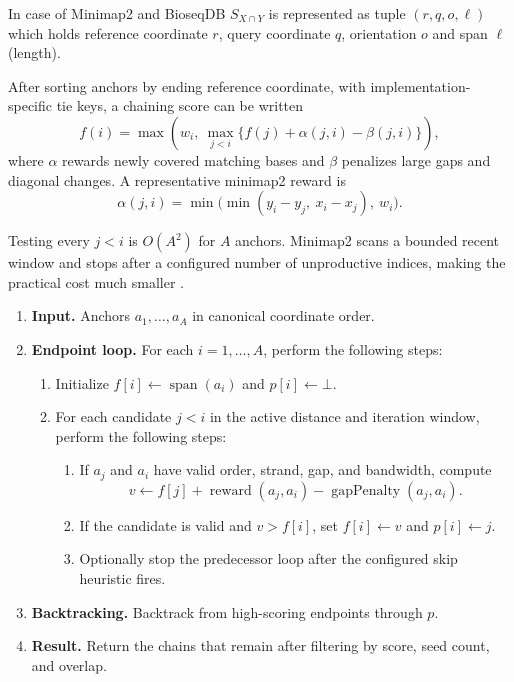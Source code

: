 In case of Minimap2 and BioseqDB $S_{X \cap Y}$ is represented as tuple \((r,q,o,\ell)\) which holds reference coordinate \(r\), query coordinate \(q\),
orientation \(o\) and span \(\ell\) (length).

After sorting anchors by
ending reference coordinate, with implementation-specific tie keys, a
chaining score can be written
\begin{equation}
 f(i)=\max\left(
     w_i,\ 
     \max_{j<i}\{f(j)+\alpha(j,i)-\beta(j,i)\}
   \right),
 \label{eq:minimap2-chain}
\end{equation}
where \(\alpha\) rewards newly covered matching bases and \(\beta\) penalizes
large gaps and diagonal changes. A representative minimap2 reward is
\[
  \alpha(j,i)=
  \min\bigl(
    \min(y_i-y_j,\ x_i-x_j),\ w_i
  \bigr).
\]

Testing every \(j<i\) is \(O(A^2)\) for \(A\) anchors.
Minimap2 scans a bounded recent window and stops after a configured number of
unproductive indices, making the practical cost much smaller \cite{minimap2_paper}.

\begin{algorithm}[H]
  \caption{Conceptual bounded predecessor chaining}
  \label{alg:anchor-chaining}
  \begin{enumerate}
    \item \textbf{Input.} Anchors \(a_1,\ldots,a_A\) in canonical coordinate
      order.
    \item \textbf{Endpoint loop.} For each \(i=1,\ldots,A\), perform the
      following steps:
      \begin{enumerate}
        \item Initialize \(f[i]\gets\operatorname{span}(a_i)\) and
          \(p[i]\gets\bot\).
        \item For each candidate \(j<i\) in the active distance and iteration
          window, perform the following steps:
          \begin{enumerate}
            \item If \(a_j\) and \(a_i\) have valid order, strand, gap, and
              bandwidth, compute
              \[
                v\gets f[j]+\operatorname{reward}(a_j,a_i)
                  -\operatorname{gapPenalty}(a_j,a_i).
              \]
            \item If the candidate is valid and \(v>f[i]\), set
              \(f[i]\gets v\) and \(p[i]\gets j\).
            \item Optionally stop the predecessor loop after the configured
              skip heuristic fires.
          \end{enumerate}
      \end{enumerate}
    \item \textbf{Backtracking.} Backtrack from high-scoring endpoints through
      \(p\).
    \item \textbf{Result.} Return the chains that remain after filtering by
      score, seed count, and overlap.
  \end{enumerate}
\end{algorithm}

